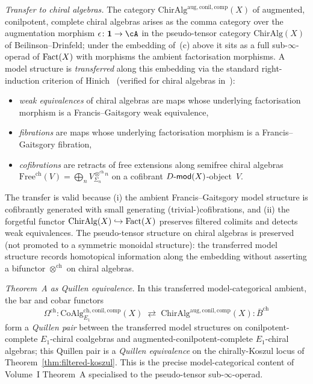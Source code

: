 \begin{remark}
\smallskip
\noindent\emph{Transfer to chiral algebras.} The category
$\mathrm{ChirAlg}^{\mathrm{aug},\mathrm{conil},\mathrm{comp}}(X)$ of
augmented, conilpotent, complete chiral algebras arises as the
comma category over the augmentation morphism
$\epsilon \colon \mathbf{1} \to \cA$ in the pseudo-tensor category
$\mathrm{ChirAlg}(X)$ of Beilinson--Drinfeld; under the embedding
of~(c) above it sits as a full sub-$\infty$-operad of $\mathrm{Fact}(X)$
with morphisms the ambient factorisation morphisms. A model
structure is \emph{transferred} along this embedding via the
standard right-induction criterion of
Hinich~\cite[\S 2]{Hinich97} (verified for chiral algebras
in~\cite[\S 4]{FG12}):
\begin{itemize}
\item \emph{weak equivalences} of chiral algebras are maps whose
 underlying factorisation morphism is a Francis--Gaitsgory weak
 equivalence,
\item \emph{fibrations} are maps whose underlying factorisation
 morphism is a Francis--Gaitsgory fibration,
\item \emph{cofibrations} are retracts of free extensions along
 semifree chiral algebras
 $\mathrm{Free}^{\mathrm{ch}}(V) = \bigoplus_n V^{\otimes^{\mathrm{ch}} n}_{\Sigma_n}$
 on a cofibrant $D\text{-}\mathsf{mod}(X)$-object~$V$.
\end{itemize}
The transfer is valid because (i) the ambient Francis--Gaitsgory
model structure is cofibrantly generated with small generating
(trivial-)cofibrations, and (ii) the forgetful functor
$\mathrm{ChirAlg}(X) \hookrightarrow \mathrm{Fact}(X)$ preserves filtered
colimits and detects weak equivalences. The pseudo-tensor structure
on chiral algebras is preserved (not promoted to a symmetric
monoidal structure): the transferred model structure records
homotopical information along the embedding without asserting a
bifunctor $\otimes^{\mathrm{ch}}$ on chiral algebras.

\smallskip
\noindent\emph{Theorem~A as Quillen equivalence.} In this transferred
model-categorical ambient, the bar and cobar functors
\[
 \Omega^{\mathrm{ch}} \colon
 \mathrm{CoAlg}_{E_1}^{\mathrm{ch,conil,comp}}(X)
 \;\rightleftarrows\;
 \mathrm{ChirAlg}^{\mathrm{aug},\mathrm{conil},\mathrm{comp}}(X)
 \colon \bar{B}^{\mathrm{ch}}
\]
form a \emph{Quillen pair} between the transferred model structures
on conilpotent-complete $E_1$-chiral coalgebras and
augmented-conilpotent-complete $E_1$-chiral algebras; this Quillen
pair is a \emph{Quillen equivalence} on the chirally-Koszul locus
of Theorem~\ref{thm:filtered-koszul}. This is the precise
model-categorical content of Volume~I Theorem~A specialised to the
pseudo-tensor sub-$\infty$-operad.


\end{remark}
